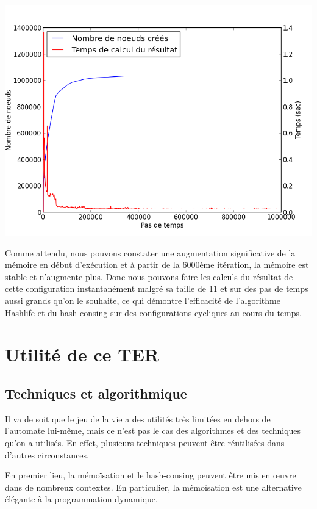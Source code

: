 \documentclass[a4paper,12pt]{report}
\begin{document}
\begin{center}
\includegraphics[scale=0.75]{ticker.png}
\end{center}

Comme attendu, nous pouvons constater une augmentation significative
de la mémoire en début d'exécution et à partir de la 6000ème
itération, la mémoire est stable et n'augmente plus. Donc nous pouvons
faire les calculs du résultat de cette configuration instantanément
malgré sa taille de 11 et sur des pas de temps aussi grands qu'on le
souhaite, ce qui démontre l'efficacité de l'algorithme Hashlife et du
hash-consing sur des configurations cycliques au cours du temps.





\chapter{Utilité de ce TER}

\section{Techniques et algorithmique}

Il va de soit que le jeu de la vie a des utilités très limitées en
dehors de l'automate lui-même, mais
ce n'est pas le cas des algorithmes et des techniques qu'on a
utilisés. En effet, plusieurs techniques peuvent être réutilisées
dans d'autres circonstances.

En premier lieu, la mémoïsation et le hash-consing
peuvent être mis en \oe uvre dans de nombreux contextes.
En particulier, la mémoïsation est une alternative élégante à la
programmation dynamique.
\end{document}

